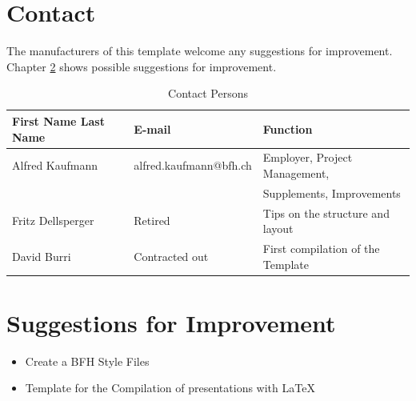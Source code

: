 \section{Contact}
\label{sec:introduction_contact}

The manufacturers of this template welcome any suggestions for improvement. Chapter \ref{sec:introduction_suggestions} shows possible suggestions for improvement.

\begin{table}[H]
	\centering
		\begin{tabular}{lll} \toprule
			\textbf{First Name Last Name} & \textbf{E-mail} & \textbf{Function} \\ \midrule
			Alfred Kaufmann & alfred.kaufmann@bfh.ch & Employer, Project Management, \\
			& & Supplements, Improvements \\ \midrule
			Fritz Dellsperger & Retired & Tips on the structure and layout \\ \midrule
			David Burri & Contracted out & First compilation of the Template \\ \bottomrule
		\end{tabular}
	\caption{Contact Persons}
	\label{tab:Contact Persons}
\end{table}


\section{Suggestions for Improvement}
\label{sec:introduction_suggestions}

\begin{itemize}
	\item Create a BFH Style Files
	\item Template for the Compilation of presentations with \LaTeX{}
\end{itemize}


